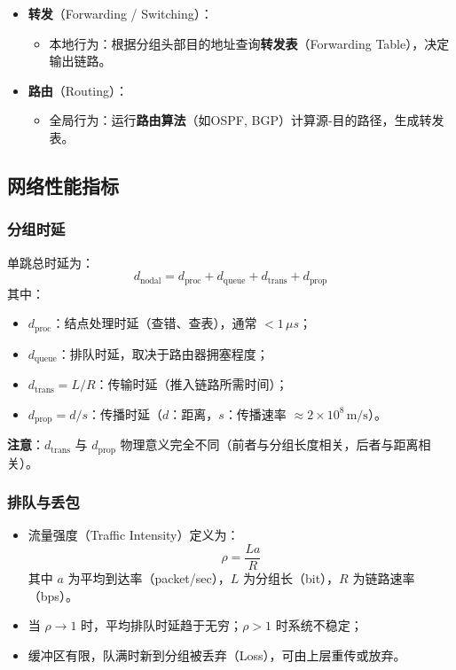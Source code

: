 \begin{itemize}
    \item \textbf{转发}（Forwarding / Switching）：
          \begin{itemize}
              \item 本地行为：根据分组头部目的地址查询\textbf{转发表}（Forwarding Table），决定输出链路。
          \end{itemize}
    \item \textbf{路由}（Routing）：
          \begin{itemize}
              \item 全局行为：运行\textbf{路由算法}（如OSPF, BGP）计算源-目的路径，生成转发表。
          \end{itemize}
\end{itemize}

\subsection{网络性能指标}

\subsubsection{分组时延}

单跳总时延为：
\[
    d_{\text{nodal}} = d_{\text{proc}} + d_{\text{queue}} + d_{\text{trans}} + d_{\text{prop}}
\]
其中：
\begin{itemize}
    \item $d_{\text{proc}}$：结点处理时延（查错、查表），通常 $< 1\,\mu s$；
    \item $d_{\text{queue}}$：排队时延，取决于路由器拥塞程度；
    \item $d_{\text{trans}} = L/R$：传输时延（推入链路所需时间）；
    \item $d_{\text{prop}} = d/s$：传播时延（$d$：距离，$s$：传播速率 $\approx 2\times10^8\,\text{m/s}$）。
\end{itemize}

\textbf{注意}：$d_{\text{trans}}$ 与 $d_{\text{prop}}$ 物理意义完全不同（前者与分组长度相关，后者与距离相关）。

\subsubsection{排队与丢包}

\begin{itemize}
    \item 流量强度（Traffic Intensity）定义为：
          \[
              \rho = \frac{L a}{R}
          \]
          其中 $a$ 为平均到达率（packet/sec），$L$ 为分组长（bit），$R$ 为链路速率（bps）。
    \item 当 $\rho \to 1$ 时，平均排队时延趋于无穷；$\rho > 1$ 时系统不稳定；
    \item 缓冲区有限，队满时新到分组被丢弃（Loss），可由上层重传或放弃。
\end{itemize}

